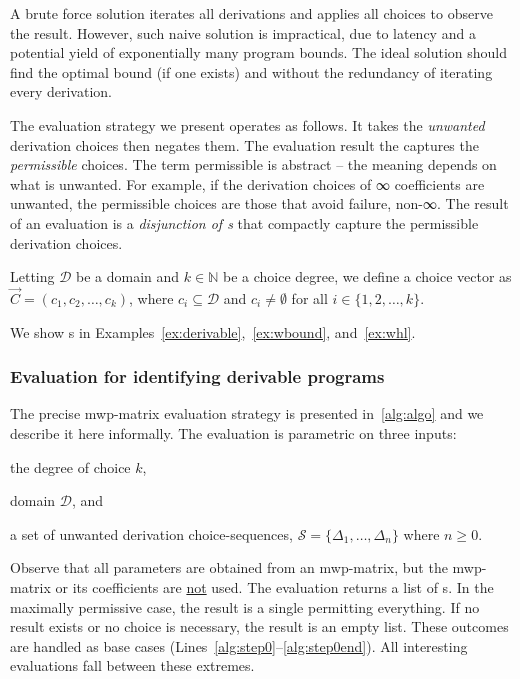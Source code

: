 A brute force solution iterates all derivations and applies all choices to observe the result.
However, such naive solution is impractical, due to latency and a potential yield of exponentially many program bounds.
The ideal solution should find the optimal bound (if one exists) and without the redundancy of iterating every derivation.

The evaluation strategy we present operates as follows.
It takes the \emph{unwanted} derivation choices then negates them.
The evaluation result the captures the \emph{permissible} choices.
The term permissible is abstract -- the meaning depends on what is unwanted.
For example, if the derivation choices of ∞ coefficients are unwanted,
the permissible choices are those that avoid failure, \ie non-∞.
The result of an evaluation is a \emph{disjunction of s} that compactly capture the permissible derivation choices.

\begin{definition}
    Letting \( \mathcal{D} \) be a domain and \( k \in \mathbb{N} \) be a choice degree,
    we define a choice vector as \( \vec{C} = (c_1, c_2, \ldots, c_k) \),
    where \( c_i \subseteq \mathcal{D} \) and \( c_i \neq \emptyset \) for all \( i \in \{1, 2, \ldots, k\} \).
\end{definition}
We show s in Examples~\ref{ex:derivable},~\ref{ex:wbound}, and~\ref{ex:whl}.

\subsubsection{Evaluation for identifying derivable programs}
\label{subsec:eval}

The precise mwp-matrix evaluation strategy is presented in~\autoref{alg:algo} and we describe it here informally.
The evaluation is parametric on three inputs:
\begin{enumerate*}[label=(\roman*)]
\item the degree of choice \(k\),
\item domain \(\mathcal{D}\), and
\item a set of unwanted derivation choice-sequences, \(\mathcal{S} = \{\Delta_1,\ldots,\Delta_n\}\) where \(n \geq 0\).
\end{enumerate*}
Observe that all parameters are obtained from an mwp-matrix, but the mwp-matrix or its coefficients are \underline{not} used.
The evaluation returns a list of s.
In the maximally permissive case, the result is a single  permitting everything.
If no result exists or no choice is necessary, the result is an empty list.
These outcomes are handled as base cases (Lines~\ref{alg:step0}--\ref{alg:step0end}).
All interesting evaluations fall between these extremes.

